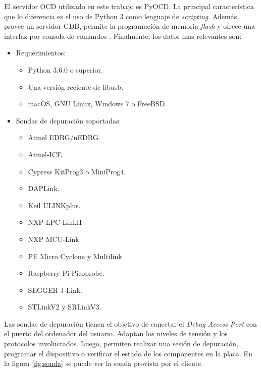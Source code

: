 El servidor OCD utilizado en este trabajo es PyOCD.
La principal característica que lo diferencia es el uso de Python 3 como lenguaje de \emph{scripting}.
Además, provee un servidor GDB, permite la programación de memoria \emph{flash} y ofrece una interfaz por consola de comandos \citep{WEBSITE:pyocd}.
Finalmente, los datos mas relevantes son:

\newpage

\begin{itemize}
    \item Requerimientos:
        \begin{itemize}
            \item Python 3.6.0 o superior.
            \item Una versión reciente de libusb.
            \item macOS, GNU Linux, Windows 7 o FreeBSD.
        \end{itemize}
    \item Sondas de depuración soportadas:
        \begin{itemize}
            \item Atmel EDBG/nEDBG.
            \item Atmel-ICE.
            \item Cypress KitProg3 o MiniProg4.
            \item DAPLink.
            \item Keil ULINKplus.
            \item NXP LPC-LinkII
            \item NXP MCU-Link
            \item PE Micro Cyclone y Multilink.
            \item Raspberry Pi Picoprobe.
            \item SEGGER J-Link.
            \item STLinkV2 y SRLinkV3.
        \end{itemize}
\end{itemize}




Las sondas de depuración tienen el objetivo de conectar el \emph{Debug Access Port} con el puerto del ordenador del usuario.
Adaptan los niveles de tensión y los protocolos involucrados.
Luego, permiten realizar una sesión de depuración, programar el dispositivo o verificar el estado de los componentes en la placa.
En la figura \ref{fig:sonda} se puede ver la sonda provista por el cliente.

